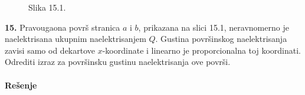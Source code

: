 \clearpage
\begin{wrapfigure}{r}{0pt}
    
    \caption{Slika 15.1.}
\end{wrapfigure}
\textbf{\Large 15.} Pravougaona povr\v{s} stranica $a$ i $b$, prikazana na slici 15.1, neravnomerno je naelektrisana ukupnim naelektrisanjem $Q$. Gustina povr\v{s}inskog naelektrisanja zavisi samo od dekartove $x$-koordinate i linearno je proporcionalna toj koordinati. Odrediti izraz za povr\v{s}insku gustinu naelektrisanja ove povr\v{s}i.
\\\\
\textbf{\Large Re\v{s}enje}\\
